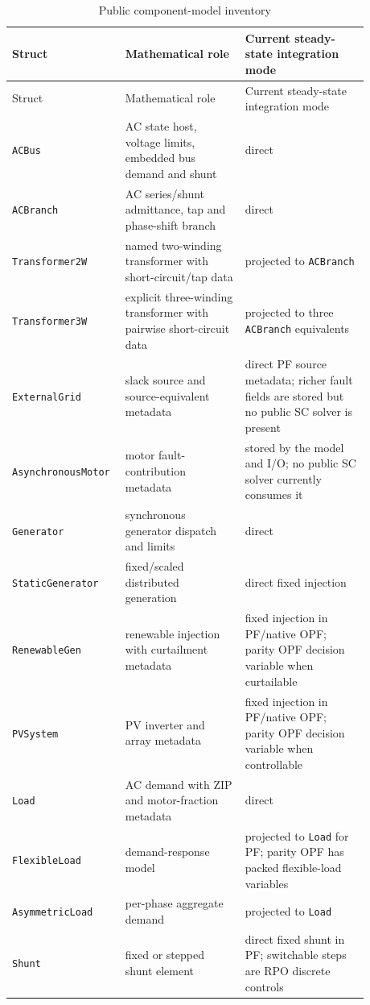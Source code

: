 \begin{longtable}{L{0.23\linewidth}L{0.32\linewidth}L{0.33\linewidth}}
\caption{Public component-model inventory}\label{tab:model-inventory}\\
\toprule
Struct & Mathematical role & Current steady-state integration mode \\
\midrule
\endfirsthead
\toprule
Struct & Mathematical role & Current steady-state integration mode \\
\midrule
\endhead
\bottomrule
\endfoot
\texttt{ACBus} & AC state host, voltage limits, embedded bus demand and shunt & direct \\
\texttt{ACBranch} & AC series/shunt admittance, tap and phase-shift branch & direct \\
\texttt{Transformer2W} & named two-winding transformer with short-circuit/tap data & projected to \texttt{ACBranch} \\
\texttt{Transformer3W} & explicit three-winding transformer with pairwise short-circuit data & projected to three \texttt{ACBranch} equivalents \\
\texttt{ExternalGrid} & slack source and source-equivalent metadata & direct PF source metadata; richer fault fields are stored but no public SC solver is present \\
\texttt{AsynchronousMotor} & motor fault-contribution metadata & stored by the model and I/O; no public SC solver currently consumes it \\
\texttt{Generator} & synchronous generator dispatch and limits & direct \\
\texttt{StaticGenerator} & fixed/scaled distributed generation & direct fixed injection \\
\texttt{RenewableGen} & renewable injection with curtailment metadata & fixed injection in PF/native OPF; parity OPF decision variable when curtailable \\
\texttt{PVSystem} & PV inverter and array metadata & fixed injection in PF/native OPF; parity OPF decision variable when controllable \\
\texttt{Load} & AC demand with ZIP and motor-fraction metadata & direct \\
\texttt{FlexibleLoad} & demand-response model & projected to \texttt{Load} for PF; parity OPF has packed flexible-load variables \\
\texttt{AsymmetricLoad} & per-phase aggregate demand & projected to \texttt{Load} \\
\texttt{Shunt} & fixed or stepped shunt element & direct fixed shunt in PF; switchable steps are RPO discrete controls \\

\end{longtable}
